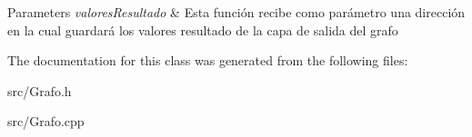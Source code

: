 \begin{DoxyParams}{Parameters}
{\em valores\-Resultado} & Esta función recibe como parámetro una dirección en la cual guardará los valores resultado de la capa de salida del grafo \\
\hline
\end{DoxyParams}


The documentation for this class was generated from the following files\-:\begin{DoxyCompactItemize}
\item 
src/Grafo.\-h\item 
src/Grafo.\-cpp\end{DoxyCompactItemize}
